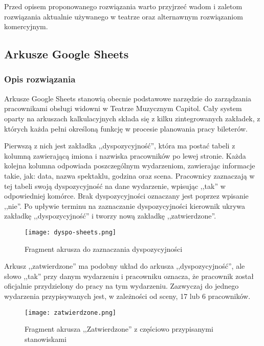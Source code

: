 \documentclass[shortabstract]{iithesis}
\begin{document}
Przed opisem proponowanego rozwiązania warto przyjrzeć wadom i zaletom rozwiązania aktualnie używanego w teatrze oraz alternawnym rozwiązaniom komercyjnym.

\subsection{Arkusze Google Sheets}

\subsubsection{Opis rozwiązania}
Arkusze Google Sheets stanowią obecnie podstawowe narzędzie do zarządzania pracownikami obsługi widowni w Teatrze Muzycznym Capitol. Cały system oparty na arkuszach kalkulacyjnych składa się z kilku zintegrowanych zakładek, z których każda pełni określoną funkcję w procesie planowania pracy bileterów.

Pierwszą z nich jest zakładka ,,dyspozycyjność'', która ma postać tabeli z kolumną zawierającą imiona i nazwiska pracowników po lewej stronie. Każda kolejna kolumna odpowiada poszczególnym wydarzeniom, zawierając informacje takie, jak: data, nazwa spektaklu, godzina oraz scena. Pracownicy zaznaczają w tej tabeli swoją dyspozycyjność na dane wydarzenie, wpisując ,,tak'' w odpowiedniej komórce. Brak dyspozycyjności oznaczany jest poprzez wpisanie ,,nie''. Po upływie terminu na zaznaczanie dyspozycyjności kierownik ukrywa zakładkę ,,dyspozycyjność'' i tworzy nową zakładkę ,,zatwierdzone''.


\begin{figure}[h!] %
\centering %
\texttt{[image: dyspo-sheets.png]} %
\caption{Fragment akrusza do zaznaczania dyspozycyjności} %
\end{figure}


Arkusz ,,zatwierdzone'' ma podobny układ do arkusza ,,dyspozycyjność'', ale słowo ,,tak'' przy danym wydarzeniu i pracowniku oznacza, że pracownik został oficjalnie przydzielony do pracy na tym wydarzeniu. Zazwyczaj do jednego wydarzenia przypisywanych jest, w zależności od sceny, 17 lub 6 pracowników.

\begin{figure}[h] %
\centering %
\texttt{[image: zatwierdzone.png]} %
\caption{Fragment akrusza ,,Zatwierdzone'' z częściowo przypisanymi stanowiskami} %
\label{fig:dyspo} %
\end{figure}
\end{document}
